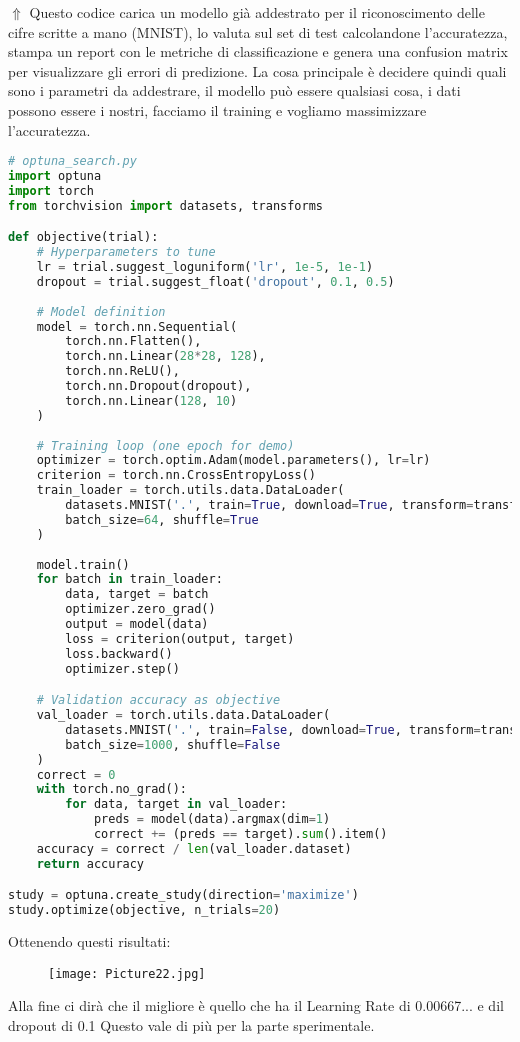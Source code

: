 \documentclass[a4paper,12pt]{article}
\begin{document}
$\Uparrow$ Questo codice carica un modello già addestrato per il riconoscimento delle cifre scritte a mano (MNIST), lo valuta sul set di test calcolandone l'accuratezza, stampa un report con le metriche di classificazione e genera una confusion matrix per visualizzare gli errori di predizione.
\newline 
La cosa principale è decidere quindi quali sono i parametri da addestrare, il modello può essere qualsiasi cosa, i dati possono essere i nostri, facciamo il training e vogliamo massimizzare l'accuratezza.
\begin{lstlisting}[language=Python, basicstyle=\ttfamily\footnotesize, breaklines=true, frame=single]
# optuna_search.py
import optuna
import torch
from torchvision import datasets, transforms

def objective(trial):
    # Hyperparameters to tune
    lr = trial.suggest_loguniform('lr', 1e-5, 1e-1)
    dropout = trial.suggest_float('dropout', 0.1, 0.5)
    
    # Model definition
    model = torch.nn.Sequential(
        torch.nn.Flatten(),
        torch.nn.Linear(28*28, 128),
        torch.nn.ReLU(),
        torch.nn.Dropout(dropout),
        torch.nn.Linear(128, 10)
    )
    
    # Training loop (one epoch for demo)
    optimizer = torch.optim.Adam(model.parameters(), lr=lr)
    criterion = torch.nn.CrossEntropyLoss()
    train_loader = torch.utils.data.DataLoader(
        datasets.MNIST('.', train=True, download=True, transform=transforms.ToTensor()),
        batch_size=64, shuffle=True
    )
    
    model.train()
    for batch in train_loader:
        data, target = batch
        optimizer.zero_grad()
        output = model(data)
        loss = criterion(output, target)
        loss.backward()
        optimizer.step()

    # Validation accuracy as objective
    val_loader = torch.utils.data.DataLoader(
        datasets.MNIST('.', train=False, download=True, transform=transforms.ToTensor()),
        batch_size=1000, shuffle=False
    )
    correct = 0
    with torch.no_grad():
        for data, target in val_loader:
            preds = model(data).argmax(dim=1)
            correct += (preds == target).sum().item()
    accuracy = correct / len(val_loader.dataset)
    return accuracy

study = optuna.create_study(direction='maximize')
study.optimize(objective, n_trials=20)
\end{lstlisting}
Ottenendo questi risultati: 
\begin{figure}[H]
    \centering
    \texttt{[image: Picture22.jpg]}
    \label{etichetta44}
\end{figure}
\noindent Alla fine ci dirà che il migliore è quello che ha il Learning Rate di 0.00667... e dil dropout di 0.1
Questo vale di più per la parte sperimentale.
\end{document}

